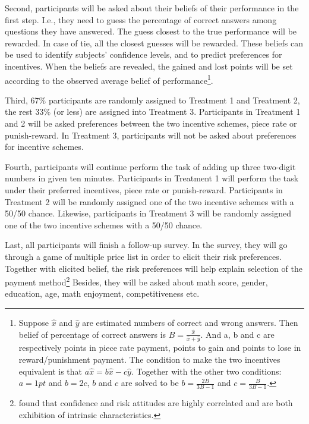 \documentclass[12pt]{article}
\begin{document}
Second, participants will be asked about their beliefs of their performance in the first step. I.e., they need to guess the percentage of correct answers among questions they have answered. The guess closest to the true performance will be rewarded. In case of tie, all the closest guesses will be rewarded. These beliefs can be used to identify subjects' confidence levels, and to predict preferences for incentives. When the beliefs are revealed, the gained and lost points will be set according to the observed average belief of performance\footnote{Suppose $\hat{x}$ and $\hat{y}$ are estimated numbers of correct and wrong answers. Then belief of percentage of correct answers is $B=\frac{\hat{x}}{\hat{x}+\hat{y}}$. And a, b and c are respectively points in piece rate payment, points to gain and points to lose in reward/punishment payment. The condition to make the two incentives equivalent is that $a\hat{x}=b\hat{x}-c\hat{y}$. Together with the other two conditions: $a=1pt$ and $b=2c$, $b$ and $c$ are solved to be $b=\frac{2B}{3B-1}$ and $c=\frac{B}{3B-1}$.}.

Third, 67\% participants are randomly assigned to Treatment 1 and Treatment 2, the rest 33\% (or less) are assigned into Treatment 3. Participants in Treatment 1 and 2 will be asked preferences between the two incentive schemes, piece rate or punish-reward. In Treatment 3, participants will not be asked about preferences for incentive schemes. 

Fourth, participants will continue perform the task of adding up three two-digit numbers in given ten minutes. Participants in Treatment 1 will perform the task under their preferred incentives, piece rate or punish-reward. Participants in Treatment 2 will be randomly assigned one of the two incentive schemes with a 50/50 chance. Likewise, participants in Treatment 3 will be randomly assigned one of the two incentive schemes with a 50/50 chance.

Last, all participants will finish a follow-up survey. In the survey, they will go through a game of multiple price list in order to elicit their risk preferences. Together with elicited belief, the risk preferences will help explain selection of the payment method\footnote{\citet{Murad2016} found that confidence and risk attitudes are highly correlated and are both exhibition of intrinsic characteristics.} Besides, they will be asked about math score, gender, education, age, math enjoyment, competitiveness etc.

\end{document}
